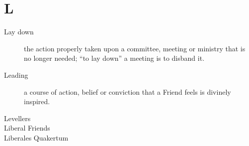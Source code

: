 \section*{L}

\articlesize

\begin{description}


 \item[Lay down]
    the action properly taken upon a committee, meeting or ministry that is no longer needed; "`to lay down"' a meeting is to disband it.

 \item[Leading]
    a course of action, belief or conviction that a Friend feels is divinely inspired.

 \item[Levellers]

 \item[Liberal Friends]

 \item[Liberales Quakertum]


 \end{description}
\normalsize
